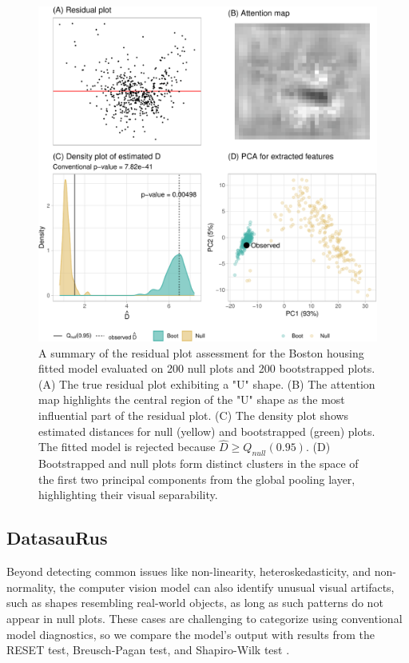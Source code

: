 \documentclass[]{interact}
\theoremstyle{plain}%
\theoremstyle{definition}
\theoremstyle{remark}
\begin{document}
\begin{figure}[!h]

{\centering \includegraphics[width=0.8\linewidth]{paper_files/figure-latex/boston-check-1} 

}

\caption{A summary of the residual plot assessment for the Boston housing fitted model evaluated on 200 null plots and 200 bootstrapped plots. (A) The true residual plot exhibiting a "U" shape. (B) The attention map highlights the central region of the "U" shape as the most influential part of the residual plot. (C) The density plot shows estimated distances for null (yellow) and bootstrapped (green) plots. The fitted model is rejected because $\hat{D} \geq Q_{null}(0.95)$. (D) Bootstrapped and null plots form distinct clusters in the space of the first two principal components from the global pooling layer, highlighting their visual separability.}\label{fig:boston-check}
\end{figure}

\subsection{DatasauRus}\label{datasaurus}

Beyond detecting common issues like non-linearity, heteroskedasticity,
and non-normality, the computer vision model can also identify unusual
visual artifacts, such as shapes resembling real-world objects, as long
as such patterns do not appear in null plots. These cases are
challenging to categorize using conventional model diagnostics, so we
compare the model's output with results from the RESET test,
Breusch-Pagan test, and Shapiro-Wilk test \citep{shapiro1965analysis}.
\end{document}
